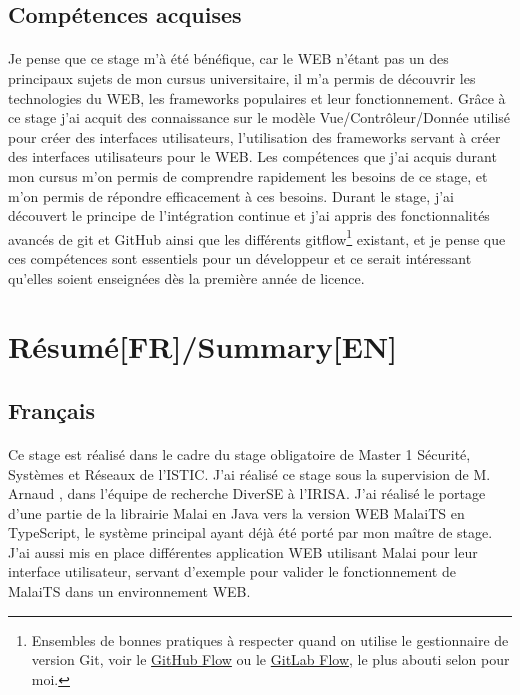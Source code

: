 \documentclass[11pt, a4paper, pdftex]{article}
\begin{document}
        \subsection{Compétences acquises}\label{subsec:compacq}
            \paragraph{}
                Je pense que ce stage m'à été bénéfique, car le WEB n'étant pas un des principaux sujets de mon cursus universitaire, il m'a permis de découvrir les technologies du WEB, les frameworks populaires et leur fonctionnement.
                Grâce à ce stage j'ai acquit des connaissance sur le modèle Vue/Contrôleur/Donnée utilisé pour créer des interfaces utilisateurs, l'utilisation des frameworks servant à créer des interfaces utilisateurs pour le WEB\@.
                Les compétences que j'ai acquis durant mon cursus m'on permis de comprendre rapidement les besoins de ce stage, et m'on permis de répondre efficacement à ces besoins.
                Durant le stage, j'ai découvert le principe de l'intégration continue et j'ai appris des fonctionnalités avancés de git et GitHub ainsi que les différents gitflow\footnote{Ensembles de bonnes pratiques à respecter quand on utilise le gestionnaire de version Git, voir le \href{https://guides.github.com/introduction/flow/}{GitHub Flow} ou le \href{https://about.gitlab.com/2014/09/29/gitlab-flow/}{GitLab Flow}, le plus abouti selon pour moi.} existant,
                et je pense que ces compétences sont essentiels pour un développeur et ce serait intéressant qu'elles soient enseignées dès la première année de licence.

    \newpage

    \section{Résumé[FR]/Summary[EN]}\label{sec:resume}
        \subsection{Français}\label{subsec:franc}
            \paragraph{}
                Ce stage est réalisé dans le cadre du stage obligatoire de Master 1 Sécurité, Systèmes et Réseaux de l'ISTIC\@.
                J'ai réalisé ce stage sous la supervision de M. Arnaud , dans l'équipe de recherche DiverSE à l'IRISA\@.
                J'ai réalisé le portage d'une partie de la librairie Malai en Java vers la version WEB MalaiTS en TypeScript, le système principal ayant déjà été porté par mon maître de stage.
                J'ai aussi mis en place différentes application WEB utilisant Malai pour leur interface utilisateur, servant d'exemple pour valider le fonctionnement de MalaiTS dans un environnement WEB\@.
\end{document}
